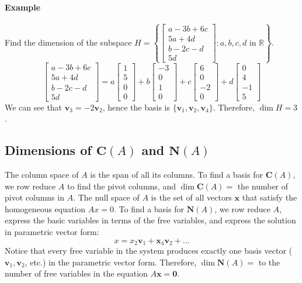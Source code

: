 \documentclass[../linear-algebra.tex]{subfiles}
\begin{document}
\paragraph{Example} Find the dimension of the subspace $H = \left\{ \begin{bmatrix} a - 3b + 6c \\ 5a + 4d \\ b - 2c - d \\ 5d \end{bmatrix} : a, b, c, d \text{ in } \mathbb{R} \right\}$.
$$\begin{bmatrix} a - 3b + 6c \\ 5a + 4d \\ b - 2c - d \\ 5d \end{bmatrix} = a \begin{bmatrix} 1 \\ 5 \\ 0 \\ 0 \end{bmatrix} + b \begin{bmatrix} -3 \\ 0 \\ 1 \\ 0 \end{bmatrix} + c \begin{bmatrix} 6 \\ 0 \\ -2 \\ 0 \end{bmatrix} + d \begin{bmatrix} 0 \\ 4 \\ -1 \\ 5 \end{bmatrix}$$
We can see that $\mathbf{v}_3 = -2\mathbf{v}_2$, hence the basis is $\{\mathbf{v}_{1}, \mathbf{v}_{2}, \mathbf{v}_{4}\}$. Therefore, $\dim H = 3$.

\subsection{Dimensions of $\mathbf{C}(A)$ and $\mathbf{N}(A)$}
The column space of $A$ is the span of all its columns. To find a basis for $\mathbf{C}(A)$, we row reduce $A$ to find the pivot columns, and $\dim \mathbf{C}(A) = $ the number of pivot columns in $A$.\newline
The null space of $A$ is the set of all vectors $\mathbf{x}$ that satisfy the homogeneous equation $Ax = 0$.
To find a basis for $\mathbf{N}(A)$, we row reduce $A$, express the basic variables in terms of the free variables, and express the solution in parametric vector form:
$$x = x_{2}\mathbf{v}_{1} + \mathbf{x}_{4}\mathbf{v}_{2} + \dots$$
Notice that every free variable in the system produces exactly one basis vector ($\mathbf{v}_{1}, \mathbf{v}_{2}$, etc.) in the parametric vector form.
Therefore, $\dim \mathbf{N}(A) = $ to the number of free variables in the equation $A\mathbf{x} = \mathbf{0}$.
\end{document}
